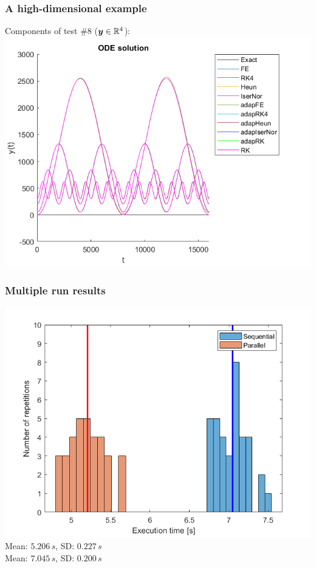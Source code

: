 \documentclass{beamer}
\begin{document}
\begin{frame}
\begin{figure}
\begin{subfigure}{.5\textwidth}
		\end{subfigure}
	\end{figure}
\end{frame}


\begin{frame} %
	\frametitle{A high-dimensional example}
	\begin{center}
		Components of test \#8 \quad ($\boldsymbol y \in \mathbb R^4$): \\[15pt]
		\includegraphics[width=0.75 \linewidth]{etc/results_test_8.png}
	\end{center}
\end{frame}


\begin{frame} %
	\frametitle{Multiple run results}
	\begin{center}
		\includegraphics[width=0.75 \linewidth]{etc/test_8_histogram.png} \\
		{\color{red}  Mean: $5.206 \, s$, \quad SD: $0.227 \, s$} \\
		{\color{blue} Mean: $7.045 \, s$, \quad SD: $0.200 \, s$}
	\end{center}
\end{frame}
\end{document}
